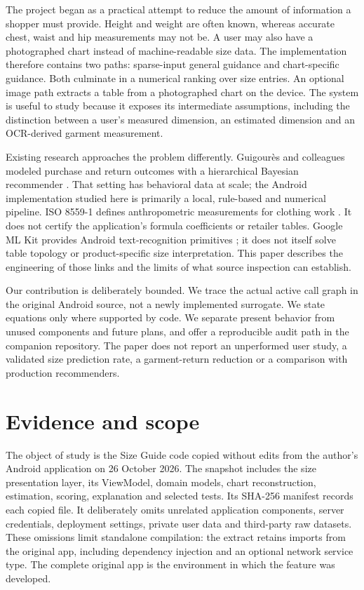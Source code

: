 \documentclass[11pt,a4paper]{article}
\begin{document}
The project began as a practical attempt to reduce the amount of information a shopper must provide. Height and weight are often known, whereas accurate chest, waist and hip measurements may not be. A user may also have a photographed chart instead of machine-readable size data. The implementation therefore contains two paths: sparse-input general guidance and chart-specific guidance. Both culminate in a numerical ranking over size entries. An optional image path extracts a table from a photographed chart on the device. The system is useful to study because it exposes its intermediate assumptions, including the distinction between a user's measured dimension, an estimated dimension and an OCR-derived garment measurement.

Existing research approaches the problem differently. Guigour\`es and colleagues modeled purchase and return outcomes with a hierarchical Bayesian recommender \cite{guigoures}. That setting has behavioral data at scale; the Android implementation studied here is primarily a local, rule-based and numerical pipeline. ISO 8559-1 defines anthropometric measurements for clothing work \cite{iso8559}. It does not certify the application's formula coefficients or retailer tables. Google ML Kit provides Android text-recognition primitives \cite{mlkit}; it does not itself solve table topology or product-specific size interpretation. This paper describes the engineering of those links and the limits of what source inspection can establish.

Our contribution is deliberately bounded. We trace the actual active call graph in the original Android source, not a newly implemented surrogate. We state equations only where supported by code. We separate present behavior from unused components and future plans, and offer a reproducible audit path in the companion repository. The paper does not report an unperformed user study, a validated size prediction rate, a garment-return reduction or a comparison with production recommenders.

\section{Evidence and scope}
The object of study is the Size Guide code copied without edits from the author's Android application on 26 October 2026. The snapshot includes the size presentation layer, its ViewModel, domain models, chart reconstruction, estimation, scoring, explanation and selected tests. Its SHA-256 manifest records each copied file. It deliberately omits unrelated application components, server credentials, deployment settings, private user data and third-party raw datasets. These omissions limit standalone compilation: the extract retains imports from the original app, including dependency injection and an optional network service type. The complete original app is the environment in which the feature was developed.
\end{document}
